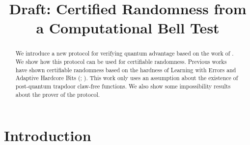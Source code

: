 \documentclass{article}
\title{Draft: Certified Randomness from a Computational Bell Test}
\affil[*]{Weizmann Institute of Science, Israel}
\date{}
\begin{document}
\onehalfspacing
\maketitle
\begin{abstract}
We introduce a new protocol for verifying quantum advantage based on the work of \cite{KCVY2022}. We show how this protocol can be used for certifiable randomness. Previous works have shown certifiable randomness based on the hardness of Learning with Errors and Adaptive Hardcore Bits (\cite{https://doi.org/10.48550/arxiv.1804.00640}; \cite{regev2009lattices}). This work only uses an assumption about the existence of post-quantum trapdoor claw-free functions. We also show some impossibility results about the prover of the protocol. 
\end{abstract}
\tableofcontents
\section{Introduction}

\end{document}
